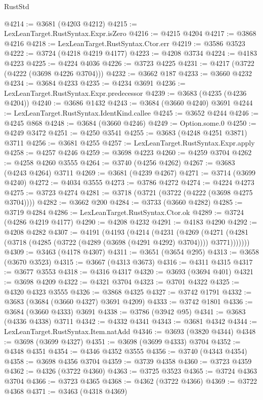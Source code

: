\begin{lexlean}{RustStd}
\begin{coremodule}
{\begin{coremodule}
{{{{{{{{{{{{{{{{{{{{{{{{{{{{{{{{{{{{{{{{{{{{{{{@4214 := @3681 (@4203 @4212)
@4215 := LexLeanTarget.RustSyntax.Expr.isZero
@4216 := @4215 @4204
@4217 := @3868 @4216
@4218 := LexLeanTarget.RustSyntax.Ctor.err
@4219 := @3586 @3523
@4222 := @3724 (@4218 @4219 @4177)
@4223 := @4208 @3734
@4224 := @4183 @4223
@4225 := @4224 @4036
@4226 := @3723 @4225
@4231 := @4217 (@3722 (@4222 (@3698 @4226 @3704)))
@4232 := @3662 @187
@4233 := @3660 @4232
@4234 := @3684 @4233
@4235 := @4234 @3691
@4236 := LexLeanTarget.RustSyntax.Expr.predecessor
@4239 := @3683 (@4235 (@4236 @4204))
@4240 := @3686 @1432
@4243 := @3684 (@3660 @4240) @3691
@4244 := LexLeanTarget.RustSyntax.IdentKind.callee
@4245 := @3652 @4244
@4246 := @4245 @868
@4248 := @3684 (@3660 @4246)
@4249 := Option.some.{0}
@4250 := @4249 @3472
@4251 := @4250 @3541
@4255 := @3683 (@4248 @4251 @3871) @3711
@4256 := @3681 @4255
@4257 := LexLeanTarget.RustSyntax.Expr.apply
@4258 := @4257 @4246
@4259 := @3698 @4223
@4260 := @4259 @3704
@4262 := @4258 @4260 @3555
@4264 := @3740 (@4256 @4262)
@4267 := @3683 (@4243 @4264) @3711
@4269 := @3681 (@4239 @4267)
@4271 := @3714 (@3699 @4240)
@4272 := @4034 @3555
@4273 := @3786 @4272
@4274 := @4224 @4273
@4275 := @3723 @4274
@4281 := @3718 (@3721 (@3722 (@4222 (@3698 @4275 @3704))))
@4282 := @3662 @200
@4284 := @3733 (@3660 @4282)
@4285 := @3719 @4284
@4286 := LexLeanTarget.RustSyntax.Ctor.ok
@4289 := @3724 (@4286 @4219 @4177)
@4290 := @4208 @4232
@4291 := @4183 @4290
@4292 := @4208 @4282
@4307 := @4191
    (@4193
      (@4214
        (@4231
          (@4269
            (@4271 (@4281 (@3718 (@4285 (@3722 (@4289 (@3698 (@4291 @4292) @3704)))) @3771)))))))
@4309 := @3463 (@4178 @4307)
@4311 := @3651 (@3654 @295)
@4313 := @3658 (@3670 @3523)
@4315 := @3667 (@4313 @3673)
@4316 := @4311 @4315
@4317 := @3677 @3553
@4318 := @4316 @4317
@4320 := @3693 (@3694 @401)
@4321 := @3698 @4209
@4322 := @4321 @3704
@4323 := @3701 @4322
@4325 := @4320 @4323 @3555
@4326 := @3868 @4325
@4327 := @3742 @1791
@4332 := @3683 (@3684 (@3660 @4327) @3691 @4209)
@4333 := @3742 @1801
@4336 := @3684 (@3660 @4333) @3691
@4338 := @3786 (@3942 @95)
@4341 := @3683 (@4336 @4338) @3711
@4342 := @4332 @4341
@4343 := @3681 @4342
@4344 := LexLeanTarget.RustSyntax.Item.natAdd
@4346 := @3693 (@3820 @4344)
@4348 := @3698 (@3699 @4327)
@4351 := @3698 (@3699 @4333) @3704
@4352 := @4348 @4351
@4354 := @4346 @4352 @3555
@4356 := @3740 (@4343 @4354)
@4358 := @3698 @4356 @3704
@4359 := @3739 @4358
@4360 := @3723 @4359
@4362 := @4326 (@3722 @4360)
@4363 := @3725 @3523
@4365 := @3724 @4363 @3704
@4366 := @3723 @4365
@4368 := @4362 (@3722 @4366)
@4369 := @3722 @4368
@4371 := @3463 (@4318 @4369)
}}}}}}}}}}}}}}}}}}}}}}}}}}}}}}}}}}}}}}}}}}}}}}}
\end{coremodule}}
\end{coremodule}
\end{lexlean}
